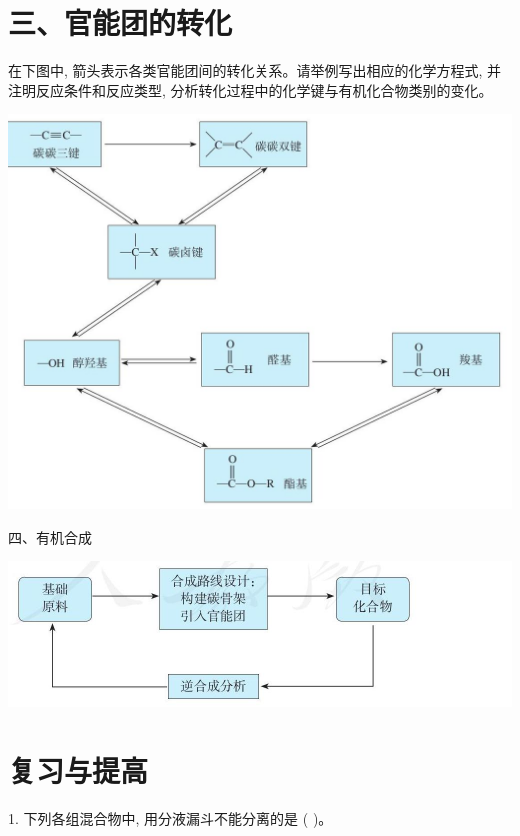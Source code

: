 \documentclass[10pt]{article}
\begin{document}
\section*{三、官能团的转化}

在下图中, 箭头表示各类官能团间的转化关系。请举例写出相应的化学方程式, 并注明反应条件和反应类型, 分析转化过程中的化学键与有机化合物类别的变化。

\begin{center}
\includegraphics[max width=1.0\textwidth]{images/0190efc5-b58a-7c43-bfb0-e0a030df9cfd_99_206120.jpg}
\end{center}

四、有机合成

\begin{center}
\includegraphics[max width=1.0\textwidth]{images/0190efc5-b58a-7c43-bfb0-e0a030df9cfd_99_401108.jpg}
\end{center}

\section*{复习与提高}

1. 下列各组混合物中, 用分液漏斗不能分离的是 ( )。
\end{document}
